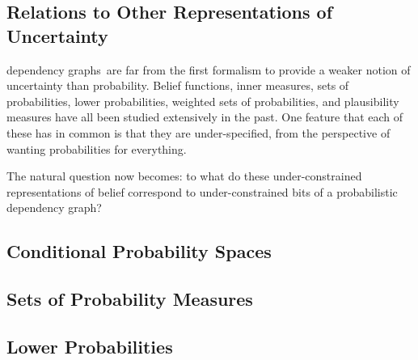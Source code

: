\documentclass{article}
\newcommand{\modelname}{probabilistic dependency graph}
\newcommand{\modelnames}{\modelname s}
\begin{document}
	
	
	
	\begin{vfull}
		\section{Relations to Other Representations of Uncertainty}
		\expandafter\expandafter\expandafter\MakeUppercase\modelnames\ are far from the first formalism to provide a weaker notion of uncertainty than probability. Belief functions, inner measures, sets of probabilities, lower probabilities, weighted sets of probabilities, and plausibility measures have all been studied extensively in the past. One feature that each of these has in common is that they are under-specified, from the perspective of wanting probabilities for everything.
		
		\begin{center}
		\end{center}
		
	
		The natural question now becomes: to what do these under-constrained representations of belief correspond to under-constrained bits of a \modelname?
		
		\subsection{Conditional Probability Spaces}
		
		\begin{center}
		\end{center}
		
	
		
	
		\subsection{Sets of Probability Measures}
	
	
		
		\subsection{Lower Probabilities}
	\end{vfull}
\end{document}
